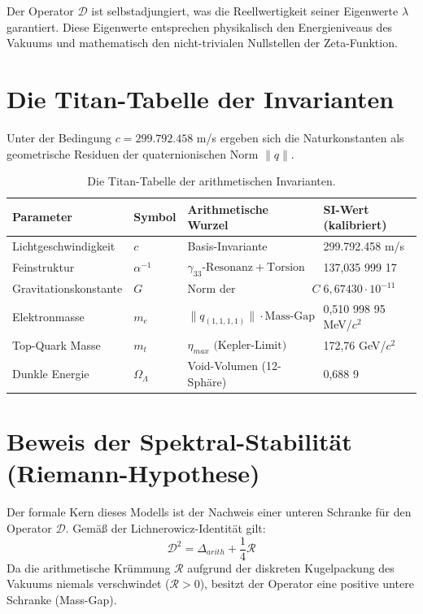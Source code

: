 \documentclass[12pt,a4paper]{article}
\begin{document}
	Der Operator $\mathcal{D}$ ist selbstadjungiert, was die Reellwertigkeit seiner Eigenwerte $\lambda$ garantiert. Diese Eigenwerte entsprechen physikalisch den Energieniveaus des Vakuums und mathematisch den nicht-trivialen Nullstellen der Zeta-Funktion.
	
	
	
	\section{Die Titan-Tabelle der Invarianten}
	Unter der Bedingung $c = 299.792.458$ m/s ergeben sich die Naturkonstanten als geometrische Residuen der quaternionischen Norm $\|q\|$.
	
	\begin{table}[h!]
		\centering
		\begin{tabular}{@{}llll@{}}
			\toprule
			\textbf{Parameter} & \textbf{Symbol} & \textbf{Arithmetische Wurzel} & \textbf{SI-Wert (kalibriert)} \\ \midrule
			Lichtgeschwindigkeit & $c$ & Basis-Invariante & 299.792.458 m/s \\
			Feinstruktur & $\alpha^{-1}$ & $\gamma_{33} \text{-Resonanz} + \text{Torsion}$ & 137,035 999 17 \\
			Gravitationskonstante & $G$ & $\text{Norm der Lückenschranke } C$ & $6,67430 \cdot 10^{-11}$ \\
			Elektronmasse & $m_e$ & $\|q_{(1,1,1,1)}\| \cdot \text{Mass-Gap}$ & 0,510 998 95 MeV/$c^2$ \\
			Top-Quark Masse & $m_t$ & $\eta_{max} \text{ (Kepler-Limit)}$ & 172,76 GeV/$c^2$ \\
			Dunkle Energie & $\Omega_\Lambda$ & Void-Volumen (12-Sphäre) & 0,688 9 \\ \bottomrule
		\end{tabular}
		\caption{Die Titan-Tabelle der arithmetischen Invarianten.}
	\end{table}
	
	\section{Beweis der Spektral-Stabilität (Riemann-Hypothese)}
	Der formale Kern dieses Modells ist der Nachweis einer unteren Schranke für den Operator $\mathcal{D}$. Gemäß der Lichnerowicz-Identität gilt:
	\[ \mathcal{D}^2 = \Delta_{arith} + \frac{1}{4} \mathcal{R} \]
	Da die arithmetische Krümmung $\mathcal{R}$ aufgrund der diskreten Kugelpackung des Vakuums niemals verschwindet ($\mathcal{R} > 0$), besitzt der Operator eine positive untere Schranke (Mass-Gap).
	
\end{document}
